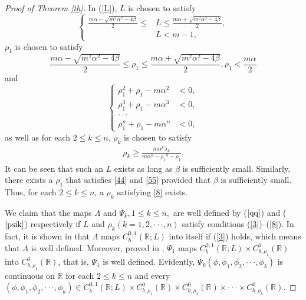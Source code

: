 \documentclass[11pt,reqno,a4paper]{amsart}
\numberwithin{equation}{section}
\begin{document}
\begin{proof}[Proof of Theorem \ref{th}]
In (\ref{L}),  $L$ is chosen to satisfy
\begin{equation}\label{3}
    \begin{cases}
        \frac{m\alpha-\sqrt{{m}^{2}
\alpha^{2}-4\beta}}{2} \le &L \le \frac{m\alpha
+\sqrt{{m}^{2}\alpha^{2}-4\beta}}{2},\\
&L < m-1,
    \end{cases}
\end{equation}
$\rho_1$ is chosen to satisfy
\begin{equation}\label{44}
    \frac{m\alpha-\sqrt{m^2\alpha^2-4\beta}}{2}\le \rho_1 \le \frac{m\alpha+\sqrt{m^2\alpha^2-4\beta}}{2} ,
 \rho_1 < \frac{m\alpha}{2}
\end{equation}
and
\begin{equation}\label{55}
    \begin{cases}
\rho_1^2+\rho_1-m\alpha^2&<0,\\
\rho_1^3+\rho_1-m\alpha^3&<0,\\
\cdot \cdot \cdot \\
\rho_1^n+\rho_1-m\alpha^n&<0,
\end{cases}
\end{equation}
as well as for each $2\le k\le n$,  $\rho_k$ is chosen to satisfy
\begin{align}\label{8}
\rho_k\ge \frac{m\alpha^k\lambda_k}{m\alpha^k-{\rho_1}^k-\rho_1}.
\end{align}
It can be seen that such an $L$ exists as long as $\beta$ is sufficiently small. Similarly, there exists a $\rho_1$ that satisfies \eqref{44} and \eqref{55}  provided that $\beta$ is sufficiently small. Thus, for each $2\le k\le n$, a $\rho_k$ satisfying \eqref{8} exists.




We claim that the maps $\Lambda$ and $\Psi_k, 1\le k\le n,$ are well defined by ($\ref{qq}$) and ($\ref{psik}$) respectively if $L$ and $\rho_k(k=1,2,\cdot \cdot \cdot,n)$ satisfy conditions (\ref{3})--(\ref{8}).
In fact, 
it is shown in \cite{tx} that $\Lambda $ maps $C_{b}^{0,1}(\mathbb{R};L)$ into itself if (\ref{3}) holds, which means that $\Lambda$ is well defined. Moreover, proved in \cite{tx},  $\Psi_1$ maps $C_{b}^{0,1}(\mathbb{R};L) \times C_{b,\rho_1}^0(\mathbb{R})  $ into $C_{b,\rho_1}^0(\mathbb{R})$, that is, $\Psi_1$ is well defined.
Evidently,
  $\Psi_k(\phi,\phi_1,\phi_2,\cdot\cdot \cdot,\phi_k)$ is continuous on $\mathbb{R}$ for each $2\le k\le n$ and every $(\phi,\phi_1,\phi_2,\cdot\cdot \cdot,\phi_k) \in C_{b}^{0,1}(\mathbb{R};L) \times C_{b,\rho_1}^{0}(\mathbb{R}) \times C_{b,\rho_2}^{0}(\mathbb{R})\times\cdot\cdot \cdot\times C_{b,\rho_k}^{0}(\mathbb{R})$.
  

\end{proof}
\end{document}
